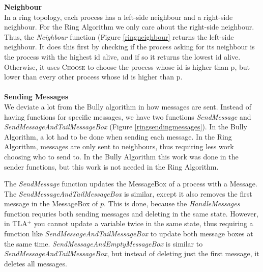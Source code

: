 \documentclass{report}
\begin{document}
\noindent
\textbf{Neighbour}\\
\noindent
In a ring topology, each process has a left-side neighbour and a right-side neighbour. For the Ring Algorithm we only care about the right-side neighbour. Thus, the \textit{Neighbour} function (Figure \ref{ringneighbour} returns the left-side neighbour. It does this first by checking if the process asking for its neighbour is the process with the highest id alive, and if so it returns the lowest id alive. Otherwise, it uses \textsc{Choose} to choose the process whose id is higher than p, but lower than every other process whose id is higher than p.
\\\\
\noindent
\textbf{Sending Messages}\\
\noindent
We deviate a lot from the Bully algorithm in how messages are sent. Instead of having functions for specific messages, we have two functions \textit{SendMessage} and \textit{SendMessageAndTailMessageBox} (Figure \ref{ringsendingmessages}). In the Bully Algorithm, a lot had to be done when sending each message. In the Ring Algorithm, messages are only sent to neighbours, thus requiring less work choosing who to send to. In the Bully Algorithm this work was done in the sender functions, but this work is not needed in the Ring Algorithm.

The \textit{SendMessage} function updates the MessageBox of a process with a Message. The \textit{SendMessageAndTailMessageBox} is similar, except it also removes the first message in the MessageBox of $p$. This is done, because the \textit{HandleMessages} function requries both sending messages and deleting in the same state. However, in TLA$^{+}$ you cannot update a variable twice in the same state, thus requiring a function like \textit{SendMessageAndTailMessageBox} to update both message boxes at the same time. \textit{SendMessageAndEmptyMessageBox} is similar to \textit{SendMessageAndTailMessageBox}, but instead of deleting just the first message, it deletes all messages.
\end{document}
